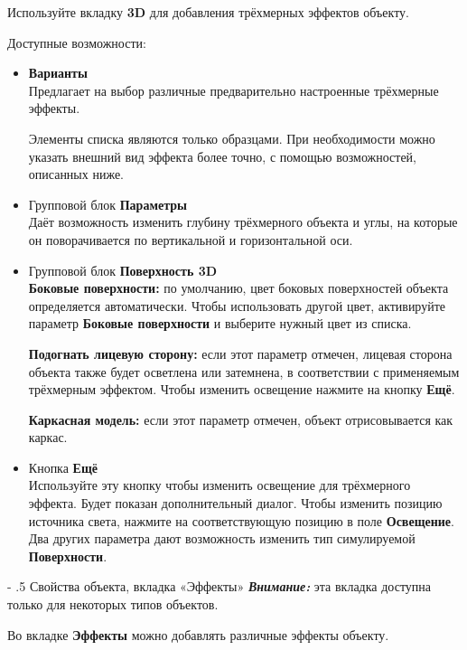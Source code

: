 \documentclass[a4paper,10pt]{article}
\makeatletter
\renewcommand\paragraph{%
   \@startsection{paragraph}{4}{0mm}%
      {-\baselineskip}%
      {.5\baselineskip}%
      {\normalfont\normalsize\bfseries}}
\makeatother
\begin{document}
Используйте вкладку \textbf{3D} для добавления трёхмерных эффектов объекту.

Доступные возможности:

\begin{itemize}
 \item \textbf{Варианты}\\
 Предлагает на выбор различные предварительно настроенные трёхмерные эффекты.
 
 Элементы списка являются только образцами. При необходимости можно указать внешний вид эффекта более точно, с помощью возможностей, описанных ниже.
  \item Групповой блок \textbf{Параметры}\\
  Даёт возможность изменить глубину трёхмерного объекта и углы, на которые он поворачивается по вертикальной и  горизонтальной оси.
    \item Групповой блок \textbf{Поверхность 3D}\\
    \textbf{Боковые поверхности:} по умолчанию, цвет боковых поверхностей объекта определяется автоматически. Чтобы использовать другой цвет, активируйте параметр \textbf{Боковые поверхности} и выберите нужный цвет из списка.
    
    \textbf{Подогнать лицевую сторону:} если этот параметр отмечен, лицевая сторона объекта также будет осветлена или затемнена, в соответствии с применяемым трёхмерным эффектом. Чтобы изменить освещение нажмите на кнопку \textbf{Ещё}.
    
    \textbf{Каркасная модель:} если этот параметр отмечен, объект отрисовывается как каркас.
    \item Кнопка \textbf{Ещё}\\
    Используйте эту кнопку чтобы изменить освещение для трёхмерного эффекта. Будет показан дополнительный диалог. Чтобы изменить позицию источника света, нажмите на соответствующую позицию в поле \textbf{Освещение}. Два других параметра дают возможность изменить тип симулируемой \textbf{Поверхности}.
 \end{itemize}

 \paragraph{Свойства объекта, вкладка «Эффекты»}
 \textit{\textbf{Внимание:}} эта вкладка доступна только для некоторых типов объектов.
 
 Во вкладке \textbf{Эффекты} можно добавлять различные эффекты объекту.
 
\end{document}
